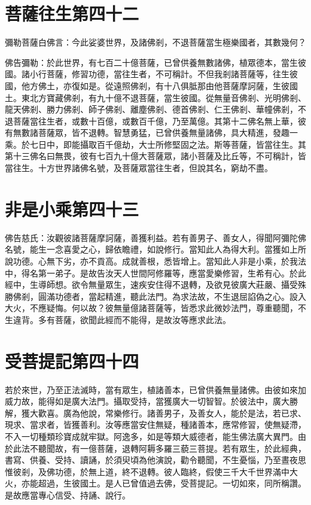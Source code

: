 \documentclass{zhvt-classic}
\begin{document}
\chapter*{菩薩往生第四十二}

彌勒菩薩白佛言：今此娑婆世界，及諸佛剎，不退菩薩當生極樂國者，其數幾何？

佛告彌勒：於此世界，有七百二十億菩薩，已曾供養無數諸佛，植眾德本，當生彼國。諸小行菩薩，修習功德，當往生者，不可稱計。不但我剎諸菩薩等，往生彼國，他方佛土，亦復如是。從遠照佛剎，有十八俱胝那由他菩薩摩訶薩，生彼國土。東北方寶藏佛剎，有九十億不退菩薩，當生彼國。從無量音佛剎、光明佛剎、龍天佛剎、勝力佛剎、師子佛剎、離塵佛剎、德首佛剎、仁王佛剎、華幢佛剎，不退菩薩當往生者，或數十百億，或數百千億，乃至萬億。其第十二佛名無上華，彼有無數諸菩薩眾，皆不退轉。智慧勇猛，已曾供養無量諸佛，具大精進，發趣一乘。於七日中，即能攝取百千億劫，大士所修堅固之法。斯等菩薩，皆當往生。其第十三佛名曰無畏，彼有七百九十億大菩薩眾，諸小菩薩及比丘等，不可稱計，皆當往生。十方世界諸佛名號，及菩薩眾當往生者，但說其名，窮劫不盡。

\chapter*{非是小乘第四十三}

佛告慈氏：汝觀彼諸菩薩摩訶薩，善獲利益。若有善男子、善女人，得聞阿彌陀佛名號，能生一念喜愛之心，歸依瞻禮，如說修行。當知此人為得大利。當獲如上所說功德。心無下劣，亦不貢高。成就善根，悉皆增上。當知此人非是小乘，於我法中，得名第一弟子。是故告汝天人世間阿修羅等，應當愛樂修習，生希有心。於此經中，生導師想。欲令無量眾生，速疾安住得不退轉，及欲見彼廣大莊嚴、攝受殊勝佛剎，圓滿功德者，當起精進，聽此法門。為求法故，不生退屈諂偽之心。設入大火，不應疑悔。何以故？彼無量億諸菩薩等，皆悉求此微妙法門，尊重聽聞，不生違背。多有菩薩，欲聞此經而不能得，是故汝等應求此法。

\chapter*{受菩提記第四十四}

若於來世，乃至正法滅時，當有眾生，植諸善本，已曾供養無量諸佛。由彼如來加威力故，能得如是廣大法門。攝取受持，當獲廣大一切智智。於彼法中，廣大勝解，獲大歡喜。廣為他說，常樂修行。諸善男子，及善女人，能於是法，若已求、現求、當求者，皆獲善利。汝等應當安住無疑，種諸善本，應常修習，使無疑滯，不入一切種類珍寶成就牢獄。阿逸多，如是等類大威德者，能生佛法廣大異門。由於此法不聽聞故，有一億菩薩，退轉阿耨多羅三藐三菩提。若有眾生，於此經典，書寫、供養、受持、讀誦，於須臾頃為他演說，勸令聽聞，不生憂惱，乃至晝夜思惟彼剎，及佛功德，於無上道，終不退轉。彼人臨終，假使三千大千世界滿中大火，亦能超過，生彼國土。是人已曾值過去佛，受菩提記。一切如來，同所稱讚。是故應當專心信受、持誦、說行。
\end{document}
